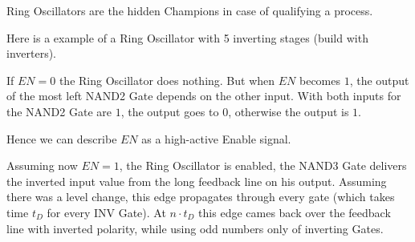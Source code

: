 Ring Oscillators are the hidden Champions in case of qualifying a process.

Here is a example of a Ring Oscillator with 5 inverting stages (build with inverters).



If $EN = 0$ the Ring Oscillator does nothing. But when $EN$ becomes $1$, the output of the most left NAND2 Gate depends on the other input. With both inputs for the NAND2 Gate are $1$, the output goes to $0$, otherwise the output is $1$.

Hence we can describe $EN$ as a high-active Enable signal.

Assuming now $EN = 1$, the Ring Oscillator is enabled, the NAND3 Gate delivers the inverted input value from the long feedback line on his output. Assuming there was a level change, this edge propagates through every gate (which takes time $t_D$ for every INV Gate). At $n \cdot t_D$ this edge cames back over the feedback line with inverted polarity, while using odd numbers only of inverting Gates.

